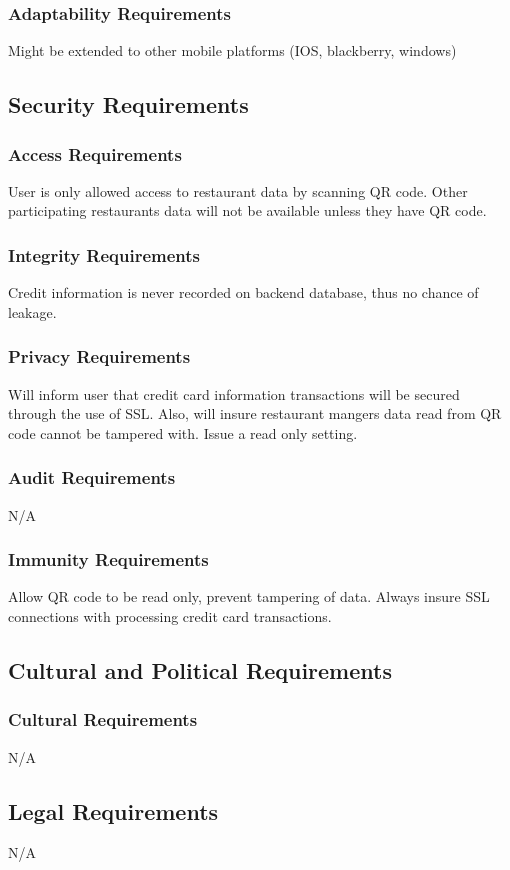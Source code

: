 \documentclass[12pt, titlepage]{article}
\begin{document}
\subsubsection{Adaptability Requirements}
Might be extended to other mobile platforms (IOS, blackberry, windows) 
\subsection{Security Requirements}
\subsubsection{Access Requirements}
User is only allowed access to restaurant data by scanning QR code. Other participating restaurants data will not be available unless they have QR code. 
\subsubsection{Integrity Requirements}
Credit information is never recorded on backend database, thus no chance of leakage.
\subsubsection{Privacy Requirements}
Will inform user that credit card information transactions will be secured through the use of SSL. Also, will insure restaurant mangers data read from QR code cannot be tampered with. Issue a read only setting. 
\subsubsection{Audit Requirements}
N/A
\subsubsection{Immunity Requirements}
Allow QR code to be read only, prevent tampering of data. 	Always insure SSL connections with processing credit card transactions.
\subsection{Cultural and Political Requirements}
\subsubsection{Cultural Requirements}
N/A
\subsection{Legal Requirements}
N/A
\end{document}
